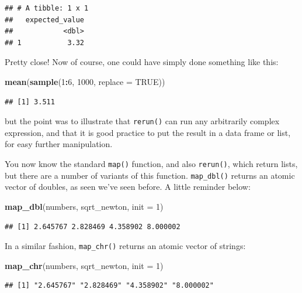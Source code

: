 \documentclass[]{gitbook}
\newenvironment{Shaded}{\begin{snugshade}}{\end{snugshade}}
\newcommand{\DataTypeTok}[1]{\textcolor[rgb]{0.13,0.29,0.53}{#1}}
\newcommand{\DecValTok}[1]{\textcolor[rgb]{0.00,0.00,0.81}{#1}}
\newcommand{\KeywordTok}[1]{\textcolor[rgb]{0.13,0.29,0.53}{\textbf{#1}}}
\newcommand{\NormalTok}[1]{#1}
\newcommand{\OperatorTok}[1]{\textcolor[rgb]{0.81,0.36,0.00}{\textbf{#1}}}
\newcommand{\OtherTok}[1]{\textcolor[rgb]{0.56,0.35,0.01}{#1}}
\begin{document}
\begin{verbatim}
## # A tibble: 1 x 1
##   expected_value
##            <dbl>
## 1           3.32
\end{verbatim}

Pretty close! Now of course, one could have simply done something like this:

\begin{Shaded}
\begin{Highlighting}[]
\KeywordTok{mean}\NormalTok{(}\KeywordTok{sample}\NormalTok{(}\DecValTok{1}\OperatorTok{:}\DecValTok{6}\NormalTok{, }\DecValTok{1000}\NormalTok{, }\DataTypeTok{replace =} \OtherTok{TRUE}\NormalTok{))}
\end{Highlighting}
\end{Shaded}

\begin{verbatim}
## [1] 3.511
\end{verbatim}

but the point was to illustrate that \texttt{rerun()} can run any arbitrarily complex expression, and that it is good
practice to put the result in a data frame or list, for easy further manipulation.

You now know the standard \texttt{map()} function, and also \texttt{rerun()}, which return lists, but there are a
number of variants of this function. \texttt{map\_dbl()} returns an atomic vector of doubles, as seen
we've seen before. A little reminder below:

\begin{Shaded}
\begin{Highlighting}[]
\KeywordTok{map_dbl}\NormalTok{(numbers, sqrt_newton, }\DataTypeTok{init =} \DecValTok{1}\NormalTok{)}
\end{Highlighting}
\end{Shaded}

\begin{verbatim}
## [1] 2.645767 2.828469 4.358902 8.000002
\end{verbatim}

In a similar fashion, \texttt{map\_chr()} returns an atomic vector of strings:

\begin{Shaded}
\begin{Highlighting}[]
\KeywordTok{map_chr}\NormalTok{(numbers, sqrt_newton, }\DataTypeTok{init =} \DecValTok{1}\NormalTok{)}
\end{Highlighting}
\end{Shaded}

\begin{verbatim}
## [1] "2.645767" "2.828469" "4.358902" "8.000002"
\end{verbatim}
\end{document}
